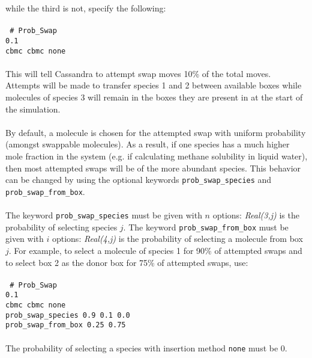 while the third is not, specify the following: \\ \\
%
\texttt{ \# Prob\_Swap\\
0.1 \\
cbmc cbmc none \\ \\
}
%
This will tell Cassandra to attempt swap moves 10\% of the total moves.
Attempts will be made to transfer species 1 and 2 between available boxes while molecules
of species 3 will remain in the boxes they are present in at the start of the simulation. \\ \\
%
By default, a molecule is chosen for the attempted swap with uniform probability
(amongst swappable molecules).
As a result, if one species has a much higher mole fraction in the system
(e.g. if calculating methane solubility in liquid water),
then most attempted swaps will be of the more abundant species.
This behavior can be changed by using the optional keywords
{\tt prob\_swap\_species} and {\tt prob\_swap\_from\_box}. \\ \\
%
The keyword \texttt{prob\_swap\_species} must be given with $n$ options:
{\it Real(3,j)} is the probability of selecting species $j$.
The keyword {\tt prob\_swap\_from\_box} must be given with $i$ options:
{\it Real(4,j)} is the probability of selecting a molecule from box $j$.
For example, to select a molecule of species 1 for 90\% of attempted swaps and
to select box 2 as the donor box for 75\% of attempted swaps, use: \\ \\
%
\texttt{ \# Prob\_Swap\\
0.1 \\
cbmc cbmc none \\
prob\_swap\_species 0.9 0.1 0.0 \\
prob\_swap\_from\_box 0.25 0.75 \\ \\ }
%
The probability of selecting a species with insertion method \texttt{none} must be 0. \\ \\
%
%
%
